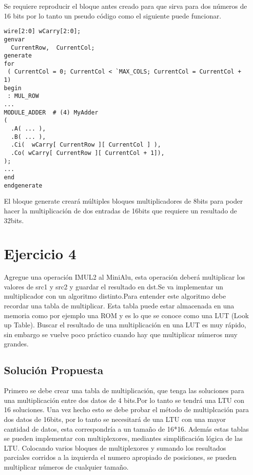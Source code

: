 \documentclass[10pt]{article}
\begin{document}
Se requiere reproducir el bloque antes creado para que sirva para dos números de 16 bits por lo tanto un pseudo código como el
siguiente puede funcionar. 

\begin{lstlisting}
wire[2:0] wCarry[2:0];
genvar
  CurrentRow,  CurrentCol;
generate
for
 ( CurrentCol = 0; CurrentCol < `MAX_COLS; CurrentCol = CurrentCol + 1)
begin
 : MUL_ROW
...
MODULE_ADDER  # (4) MyAdder
(
  .A( ... ),
  .B( ... ),
  .Ci(  wCarry[ CurrentRow ][ CurrentCol ] ),
  .Co( wCarry[ CurrentRow ][ CurrentCol + 1]),
);
...
end
endgenerate
\end{lstlisting}

El bloque generate creará múltiples bloques multiplicadores de 8bits para poder hacer la multiplicación de dos entradas de 16bits que requiere un resultado de 32bits.
\newpage

\section*{Ejercicio 4}
Agregue una operación IMUL2 al MiniAlu, esta operación deberá multiplicar los valores de src1 y src2 y guardar el resultado en dst.Se va implementar un multiplicador con un algoritmo distinto.Para entender este algoritmo debe recordar una tabla de multiplicar.
Esta tabla puede estar almacenada en una memoria como por ejemplo una ROM y es lo que se conoce como una LUT (Look up Table).
Buscar el resultado de una multiplicación en una LUT es muy rápido, sin embargo se vuelve poco práctico cuando hay que multiplicar números muy grandes.

\subsection*{Solución Propuesta}
Primero se debe crear una tabla de multiplicación, que tenga las soluciones para una multiplicación entre dos datos de 4 bits.Por lo tanto se tendrá una LTU con 16 soluciones. 
Una vez hecho esto se debe probar el método de multiplcación para dos datos de 16bits, por lo tanto se necesitará de una LTU con una mayor cantidad de datos, esta correspondría a un tamaño de 16*16.
Además estas tablas se pueden implementar con multiplexores, mediantes simplificación lógica de las LTU. Colocando varios bloques de multiplexores y sumando los resultados parciales corridos a la izquierda el numero apropiado de posiciones, se pueden
multiplicar números de cualquier tamaño.
\end{document}
